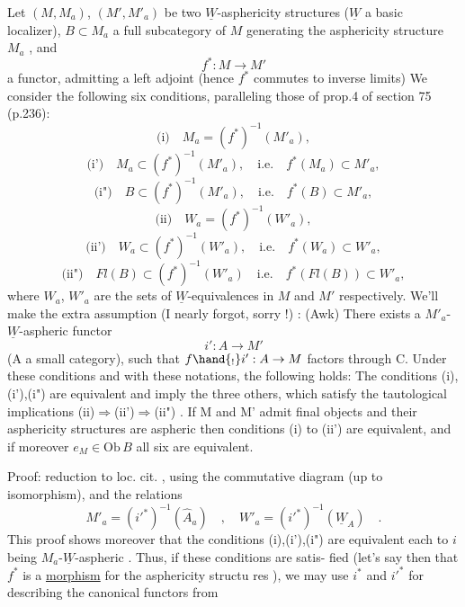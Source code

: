 
  Let $(M,M_a)$, $(M',M'_a)$ be two $\underline{W}$-asphericity structures ($\underline{W}$ a basic
localizer), $B \subset M_a$ a full subcategory of $M$ generating the asphericity
structure $M_a$ , and
\[ f^* : M \longrightarrow M' \]
a functor, admitting a left adjoint  (hence $f^*$ commutes to inverse limits)
We consider the following six conditions, paralleling those of prop.4 of
section 75 (p.236):
\[ \text{(i)} \quad M_a = (f^*)^{-1}(M'_a ) , \]
\[ \text{(i')} \quad M_a \subset (f^*)^{-1}(M'_a) , \quad \text{i.e.} \quad f^*(M_a) \subset M'_a , \]
\[ \text{(i")} \quad B \subset (f^*)^{-1}(M'_a) , \quad \text{i.e.} \quad f^*(B) \subset M'_a , \]
\[ \text{(ii)} \quad W_a =(f^*)^{-1}(W'_a) , \]
\[ \text{(ii')} \quad W_a \subset (f^*)^{-1}(W'_a) , \quad \text{i.e.} \quad f^*(W_a) \subset W'_a , \]
\[ \text{(ii")} \quad Fl(B) \subset (f^*)^{-1}(W'_a) \quad \text{i.e.} \quad f^*(Fl(B)) \subset W'_a , \]
where $W_a$, $W'_a$ are the sets of $\underline{W}$-equivalences in $M$ and $M'$ respectively.
We'll make the extra assumption (I nearly forgot, sorry !) :
(Awk) There exists a  $M'_a$-$\underline{W}$-aspheric functor
\[ i' : A \longrightarrow M' \]
(A a small category), such that  $f\hand{_!}i' : A \rightarrow M$ factors through C.
Under these conditions and with these notations, the following holds:
The conditions (i),(i'),(i") are equivalent and imply the three others,
which satisfy the tautological implications (ii)$\Rightarrow$(ii')$\Rightarrow$(ii") . If
M and M' admit final objects and their asphericity structures are aspheric\hand{\unsure{,}}
then    conditions (i) to (ii') are equivalent, and if moreover $e_M \in \mathrm{Ob}\, B$\hand{\unsure{,}}
all six are equivalent.

Proof: reduction to loc. cit. , using the commutative diagram
(up to isomorphism), and the relations
\[ M'_a =(i'^*)^{-1}(\hat{A}_a) \quad , \quad W'_a = (i'^*)^{-1}(\underline{W}_A) \quad . \]
This proof shows moreover that the conditions (i),(i'),(i") are equivalent
each to $i$ being $M_a$-$\underline{W}$-aspheric . Thus, if these conditions are satis-%
fied (let's say then that $f^*$ is a \uline{morphism}\inserted{(*)} for the asphericity structu
res ), we may use $i^*$ and $i'^*$ for describing the canonical functors from

